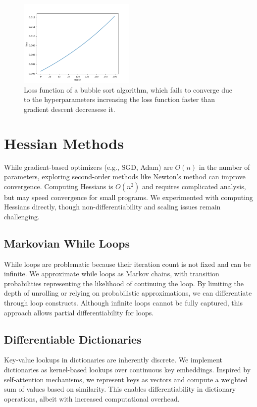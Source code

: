 \documentclass{article}
\begin{document}
\begin{figure}[h!]
  \begin{center}
    \includegraphics[width=0.5\textwidth]{bubble_sort.png}
  \end{center}
  \caption{Loss function of a bubble sort algorithm, which fails to converge due to the hyperparameters increasing the loss function faster than gradient descent decreasese it.}
  \label{fig:bubble_sort}
\end{figure}
\section{Hessian Methods}
While gradient-based optimizers (e.g., SGD, Adam) are $O(n)$ in the number of parameters, exploring second-order methods like Newton's method can improve convergence. Computing Hessians is $O(n^2)$ and requires complicated analysis, but may speed convergence for small programs. We experimented with computing Hessians directly, though non-differentiability and scaling issues remain challenging.

\subsection{Markovian While Loops}
While loops are problematic because their iteration count is not fixed and can be infinite. We approximate while loops as Markov chains, with transition probabilities representing the likelihood of continuing the loop. By limiting the depth of unrolling or relying on probabilistic approximations, we can differentiate through loop constructs. Although infinite loops cannot be fully captured, this approach allows partial differentiability for loops.

\subsection{Differentiable Dictionaries}
Key-value lookups in dictionaries are inherently discrete. We implement dictionaries as kernel-based lookups over continuous key embeddings. Inspired by self-attention mechanisms, we represent keys as vectors and compute a weighted sum of values based on similarity. This enables differentiability in dictionary operations, albeit with increased computational overhead.
\end{document}
